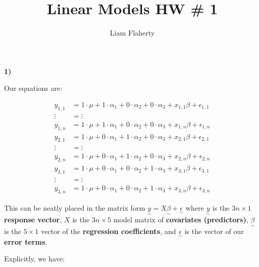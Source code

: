 \documentclass[12pt, letterpaper]{article}
\title{Linear Models HW \# 1}
\author{Liam Flaherty}
\date{\parbox{\linewidth}{\centering%
		Professor Maity\endgraf\bigskip
		NCSU: ST503-651\endgraf\bigskip
		May 20, 2024 \endgraf}}
\theoremstyle{definition}
\numberwithin{equation}{section}
\newcommand{\+}[1]{+_{\scalebox{.375}{#1}}}
\newcommand{\1}{\mathbbm{1}}
\begin{document}
\maketitle
\thispagestyle{empty}

	
\newpage\clearpage\noindent


\noindent\textbf{1) }

\vspace{\baselineskip}
\noindent\textbf{}
\vspace{\baselineskip}

Our equations are:

\vspace{-0.5cm}
\begin{align*}
	y_{1,1}&=1\cdot \mu+1\cdot \alpha_1+0\cdot\alpha_2+0\cdot\alpha_3+x_{1,1}\beta+\epsilon_{1,1}\\
	\vdots&=\vdots\\ 
	y_{1,n}&=1\cdot \mu+1\cdot \alpha_1+0\cdot\alpha_2+0\cdot\alpha_3+x_{1,n}\beta+\epsilon_{1,n}\\
	y_{2,1}&=1\cdot \mu+0\cdot \alpha_1+1\cdot\alpha_2+0\cdot\alpha_3+x_{2,1}\beta+\epsilon_{2,1}\\
	\vdots &= \vdots\\
	y_{2,n}&=1\cdot \mu+0\cdot \alpha_1+1\cdot\alpha_2+0\cdot\alpha_3+x_{2,n}\beta+\epsilon_{2,n}\\
	y_{3,1}&=1\cdot \mu+0\cdot \alpha_1+0\cdot\alpha_2+1\cdot\alpha_3+x_{3,1}\beta+\epsilon_{3,1}\\
	\vdots &= \vdots\\
	y_{3,n}&=1\cdot \mu+0\cdot \alpha_1+0\cdot\alpha_2+1\cdot\alpha_3+x_{3,n}\beta+\epsilon_{3,n}
\end{align*}

This can be neatly placed in the matrix form $\underset{\sim}{y}=X\underset{\sim}{\beta}+\underset{\sim}{\epsilon}$ where $\underset{\sim}{y}$ is the $3n \times 1$ \textbf{response vector}, $X$ is the $3n \times 5$ model matrix of \textbf{covariates (predictors)}, $\underset{\sim}{\beta}$ is the $5 \times 1$ vector of the \textbf{regression coefficients}, and $\underset{\sim}{\epsilon}$ is the vector of our \textbf{error terms}.
\vspace{\baselineskip}

Explicitly, we have:
\end{document}
